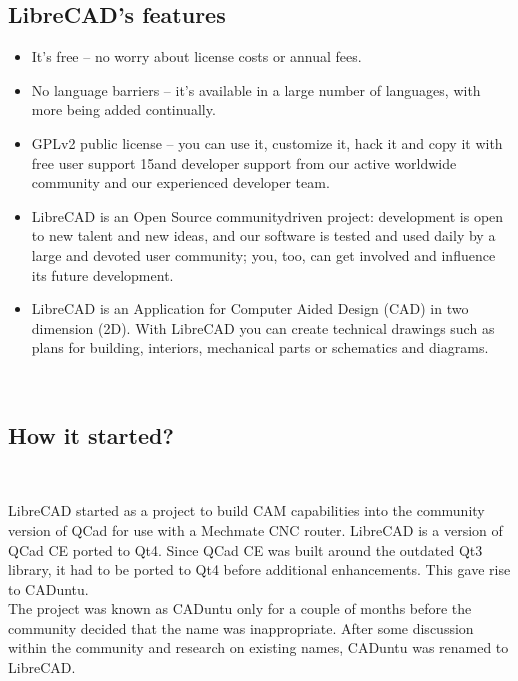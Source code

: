 \subsection{LibreCAD's features}
\begin{itemize}
\item  It's free – no worry about license costs or annual fees.
\item No  language  barriers  –  it's  available  in  a  large  number  of  languages,  with  more  being  added
continually.
\item GPLv2  public  license  –  you  can  use  it,  customize  it,  hack  it  and  copy  it  with  free  user  support
15and  developer  support  from  our  active  worldwide  community  and  our  experienced  developer
team.
\item LibreCAD  is an Open Source community­driven project: development is open to new talent and
new  ideas,  and  our  software  is  tested  and  used  daily  by  a  large  and  devoted  user  community;
you, too, can get involved and influence its future development.
\item LibreCAD  is  an  Application  for  Computer  Aided  Design  (CAD)  in  two  dimension  (2D).  With
LibreCAD  you  can  create  technical  drawings  such  as  plans  for  building,  interiors,  mechanical
parts or schematics and diagrams.
\end{itemize}

\
\
\

\subsection{How it started?}

\
\

LibreCAD  started  as  a   project  to  build  CAM  capabilities  into  the  community  version  of  QCad  for  use with  a  Mechmate  CNC  router.  LibreCAD  is  a  version  of  QCad  CE  ported  to  Qt4.  Since  QCad  CE was  built  around  the  outdated  Qt3  library,  it  had  to  be  ported  to  Qt4  before  additional  enhancements. This gave rise to CADuntu.\\

The  project  was  known as CADuntu only for a  couple of months before the community decided that the
name  was  inappropriate.  After  some  discussion  within  the  community  and  research  on  existing  names, CADuntu was renamed to LibreCAD.\\

